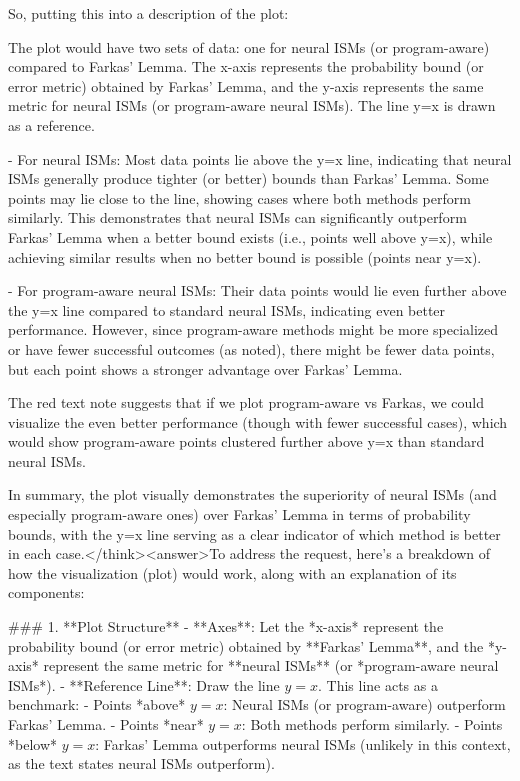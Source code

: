 So, putting this into a description of the plot:

The plot would have two sets of data: one for neural ISMs (or program-aware) compared to Farkas' Lemma. The x-axis represents the probability bound (or error metric) obtained by Farkas' Lemma, and the y-axis represents the same metric for neural ISMs (or program-aware neural ISMs). The line y=x is drawn as a reference. 

- For neural ISMs: Most data points lie above the y=x line, indicating that neural ISMs generally produce tighter (or better) bounds than Farkas' Lemma. Some points may lie close to the line, showing cases where both methods perform similarly. This demonstrates that neural ISMs can significantly outperform Farkas' Lemma when a better bound exists (i.e., points well above y=x), while achieving similar results when no better bound is possible (points near y=x).

- For program-aware neural ISMs: Their data points would lie even further above the y=x line compared to standard neural ISMs, indicating even better performance. However, since program-aware methods might be more specialized or have fewer successful outcomes (as noted), there might be fewer data points, but each point shows a stronger advantage over Farkas' Lemma.

The red text note suggests that if we plot program-aware vs Farkas, we could visualize the even better performance (though with fewer successful cases), which would show program-aware points clustered further above y=x than standard neural ISMs.

In summary, the plot visually demonstrates the superiority of neural ISMs (and especially program-aware ones) over Farkas' Lemma in terms of probability bounds, with the y=x line serving as a clear indicator of which method is better in each case.</think><answer>To address the request, here’s a breakdown of how the visualization (plot) would work, along with an explanation of its components:  


### 1. **Plot Structure**  
- **Axes**: Let the *x-axis* represent the probability bound (or error metric) obtained by **Farkas' Lemma**, and the *y-axis* represent the same metric for **neural ISMs** (or *program-aware neural ISMs*).  
- **Reference Line**: Draw the line \( y = x \). This line acts as a benchmark:  
  - Points *above* \( y = x \): Neural ISMs (or program-aware) outperform Farkas' Lemma.  
  - Points *near* \( y = x \): Both methods perform similarly.  
  - Points *below* \( y = x \): Farkas' Lemma outperforms neural ISMs (unlikely in this context, as the text states neural ISMs outperform).  


